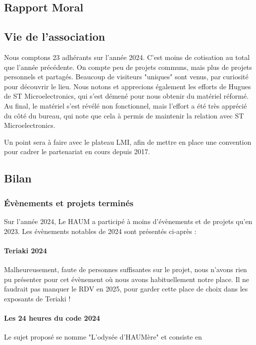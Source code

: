 \documentclass[a4paper, 11pt]{article}
\begin{document}
\clearpage
\begin{appendices}
\section{Rapport Moral}

\subsection{Vie de l'association}

Nous comptons 23 adhérants sur l'année 2024. C'est moins de cotisation au total 
que l'année précédente.
On compte peu de projets communs, mais plus de projets personnels et partagés.
Beaucoup de visiteurs "uniques" sont venus, par curiosité pour découvrir le lieu.
Nous notons et apprecions également les efforts de Hugues de ST Microelectronics, qui
s'est démené pour nous obtenir du matériel réformé. Au final, le matériel s'est révélé 
non fonctionnel, mais l'effort a été très apprécié du côté du bureau, qui note que cela 
à permis de maintenir la relation avec ST Microelectronics.

Un point sera à faire avec le plateau LMI, afin de mettre en place une convention
pour cadrer le partenariat en cours depuis 2017.

\subsection{Bilan}

\subsubsection{Évènements et projets terminés}

Sur l'année 2024, Le HAUM a participé à moins d'évènements et de projets qu'en 2023. 
Les évènements notables de 2024 sont présentés ci-après :

\paragraph{Teriaki 2024} Malheureusement, faute de personnes suffisantes sur le projet,
nous n'avons rien pu présenter pour cet évènement où nous avons habituellement notre 
place. Il ne faudrait pas manquer le RDV en 2025, pour garder cette place de choix dans 
les exposants de Teriaki !

\paragraph{Les 24 heures du code 2024} Le sujet proposé se nomme "L'odysée d'HAUMère" et 
consiste en 


\end{appendices}
\end{document}
